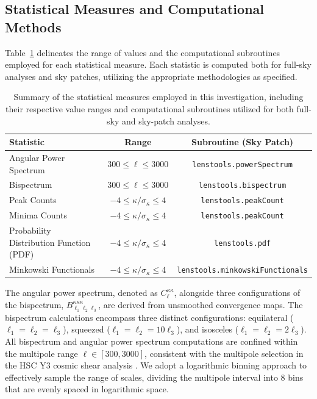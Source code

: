 \subsection{Statistical Measures and Computational Methods}
Table~\ref{tab:statistics} delineates the range of values and the computational subroutines employed for each statistical measure. Each statistic is computed both for full-sky analyses and sky patches, utilizing the appropriate methodologies as specified.
\begin{table}[htbp]
    \centering
    \begin{tabular}{lcc}
    \toprule
    \textbf{Statistic} & \textbf{Range} & \textbf{Subroutine (Sky Patch)} \\
    \midrule
    Angular Power Spectrum & $300 \leq \ell \leq 3000$ & \texttt{lenstools.powerSpectrum} \\
    Bispectrum & $300 \leq \ell \leq 3000$ & \texttt{lenstools.bispectrum} \\
    Peak Counts & $-4 \leq \kappa/\sigma_\kappa \leq 4$ & \texttt{lenstools.peakCount} \\
    Minima Counts & $-4 \leq \kappa/\sigma_\kappa \leq 4$ & \texttt{lenstools.peakCount} \\
    Probability Distribution Function (PDF) & $-4 \leq \kappa/\sigma_\kappa \leq 4$ & \texttt{lenstools.pdf} \\
    Minkowski Functionals & $-4 \leq \kappa/\sigma_\kappa \leq 4$ & \texttt{lenstools.minkowskiFunctionals} \\
    \bottomrule
    \end{tabular}
    \caption{Summary of the statistical measures employed in this investigation, including their respective value ranges and computational subroutines utilized for both full-sky and sky-patch analyses.}\label{tab:statistics}
\end{table}
The angular power spectrum, denoted as $C_{\ell}^{\kappa\kappa}$, alongside three configurations of the bispectrum, $B_{\ell_1\ell_2\ell_3}^{\kappa\kappa\kappa}$, are derived from unsmoothed convergence maps. The bispectrum calculations encompass three distinct configurations: equilateral ($\ell_1 = \ell_2 = \ell_3$), squeezed ($\ell_1 = \ell_2 = 10\ell_3$), and isosceles ($\ell_1 = \ell_2 = 2\ell_3$). 
All bispectrum and angular power spectrum computations are confined within the multipole range $\ell \in [300, 3000]$, consistent with the multipole selection in the HSC Y3 cosmic shear analysis \citep{2023PhRvD.108l3519D}. We adopt a logarithmic binning approach to effectively sample the range of scales, dividing the multipole interval into 8 bins that are evenly spaced in logarithmic space. 

